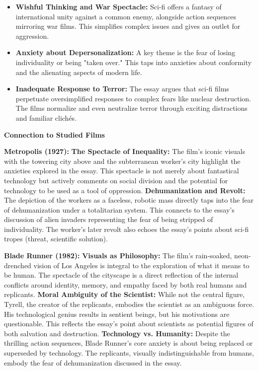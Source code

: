 \documentclass[11pt,fleqn]{book}
\begin{document}
\begin{itemize}
\item \textbf{Wishful Thinking and War Spectacle:}  Sci-fi offers a fantasy of international unity against a common enemy, alongside action sequences mirroring war films. This simplifies complex issues and gives an outlet for aggression.

\item \textbf{Anxiety about Depersonalization:} A key theme is the fear of losing individuality or being "taken over."  This taps into anxieties about conformity and the alienating aspects of modern life. 

\item \textbf{Inadequate Response to Terror:} The essay argues that sci-fi films perpetuate oversimplified responses to complex fears like nuclear destruction. The films normalize and even neutralize terror through exciting distractions and familiar clichés.
\end{itemize}
\vspace{5pt}
\textbf{Connection to Studied Films}

 \textbf{Metropolis (1927):}
     \textbf{The Spectacle of Inequality:} The film's iconic visuals with the towering city above and the subterranean worker's city highlight the anxieties explored in the essay. This spectacle is not merely about fantastical technology but actively comments on social division and the potential for technology to be used as a tool of oppression.
     \textbf{Dehumanization and Revolt:} The depiction of the workers as a faceless, robotic mass directly taps into the fear of dehumanization under a totalitarian system. This connects to the essay's discussion of alien invaders representing the fear of being stripped of individuality. The worker's later revolt also echoes the essay's points about sci-fi tropes (threat, scientific solution). 

 \textbf{Blade Runner (1982):}
     \textbf{Visuals as Philosophy:} The film's rain-soaked, neon-drenched vision of Los Angeles is integral to the exploration of what it means to be human. The spectacle of the cityscape is a direct reflection of the internal conflicts around identity, memory, and empathy faced by both real humans and replicants.
     \textbf{Moral Ambiguity of the Scientist:} While not the central figure, Tyrell, the creator of the replicants, embodies the scientist as an ambiguous force. His technological genius results in sentient beings, but his motivations are questionable. This reflects the essay's point about scientists as potential figures of both salvation and destruction.
     \textbf{Technology vs. Humanity:}  Despite the thrilling action sequences, Blade Runner's core anxiety is about being replaced or superseded by technology.  The replicants, visually indistinguishable from humans, embody the fear of dehumanization discussed in the essay.
\end{document}
